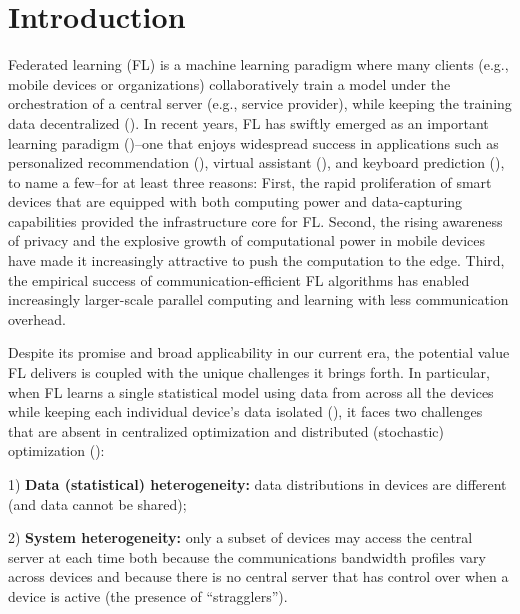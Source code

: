

\section{Introduction}
Federated learning (FL) is a machine learning paradigm where many clients (e.g., mobile devices or organizations) collaboratively train a model under the orchestration of a central server (e.g., service provider), while keeping the training data decentralized (\cite{smith2017federated, kairouz2019advances}). In recent years, FL has swiftly emerged as an important learning paradigm (\cite{mcmahan2016communication,li2018federated})--one that enjoys widespread success in applications such as personalized recommendation (\cite{chen2018federated}), virtual assistant (\cite{lam2019protecting}), and keyboard prediction (\cite{47586}), to name a few--for at least three reasons: First, the rapid proliferation of smart devices that are equipped with both computing power and data-capturing capabilities provided the infrastructure core for FL. Second, the rising awareness of privacy and the explosive growth of computational power in mobile devices have made it increasingly attractive to push the computation to the edge. Third, the empirical success of communication-efficient FL algorithms has enabled increasingly larger-scale parallel computing and learning with less communication overhead.

Despite its promise and broad applicability in our current era, the potential value FL delivers is coupled with the unique challenges it brings forth. In particular, when FL learns a single statistical model using data from across all the devices while keeping each individual device's data isolated (\cite{kairouz2019advances}), it faces two challenges that are absent in centralized optimization and distributed (stochastic) optimization (\cite{zhou2017convergence, stich2018local,khaled2019first,liang2019variance,wang2018cooperative,woodworth2018graph,wang2019adaptive,jiang2018linear,yu2019parallel,yu2019linear, khaled2020tighter,koloskova2020unified,woodworth2020local,woodworth2020minibatch}):

1) \textbf{Data (statistical) heterogeneity:} data distributions in devices are different (and data cannot be shared);

2) \textbf{System heterogeneity:} only a subset of devices may access the central server at each time both because the communications bandwidth profiles vary across devices and because there is no central server that has control over when a device is active (the presence of ``stragglers''). 

